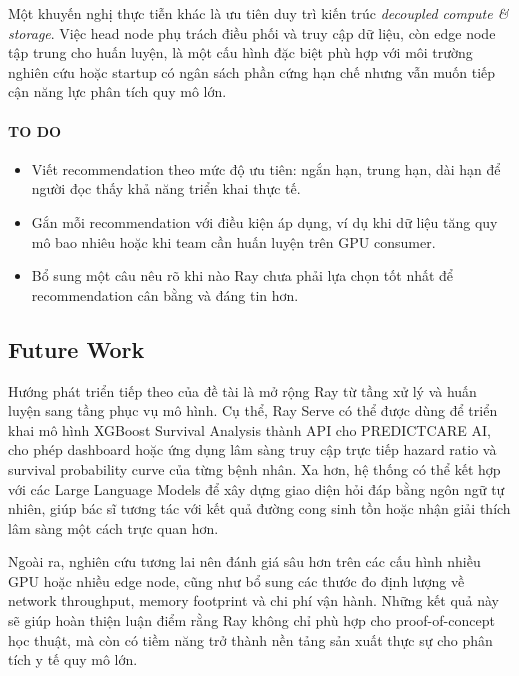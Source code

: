 Một khuyến nghị thực tiễn khác là ưu tiên duy trì kiến trúc \textit{decoupled compute \& storage}. Việc head node phụ trách điều phối và truy cập dữ liệu, còn edge node tập trung cho huấn luyện, là một cấu hình đặc biệt phù hợp với môi trường nghiên cứu hoặc startup có ngân sách phần cứng hạn chế nhưng vẫn muốn tiếp cận năng lực phân tích quy mô lớn.

\paragraph{TO DO}
\begin{itemize}
    \item Viết recommendation theo mức độ ưu tiên: ngắn hạn, trung hạn, dài hạn để người đọc thấy khả năng triển khai thực tế.
    \item Gắn mỗi recommendation với điều kiện áp dụng, ví dụ khi dữ liệu tăng quy mô bao nhiêu hoặc khi team cần huấn luyện trên GPU consumer.
    \item Bổ sung một câu nêu rõ khi nào Ray chưa phải lựa chọn tốt nhất để recommendation cân bằng và đáng tin hơn.
\end{itemize}

\subsection{Future Work}
Hướng phát triển tiếp theo của đề tài là mở rộng Ray từ tầng xử lý và huấn luyện sang tầng phục vụ mô hình. Cụ thể, Ray Serve có thể được dùng để triển khai mô hình XGBoost Survival Analysis thành API cho PREDICTCARE AI, cho phép dashboard hoặc ứng dụng lâm sàng truy cập trực tiếp hazard ratio và survival probability curve của từng bệnh nhân. Xa hơn, hệ thống có thể kết hợp với các Large Language Models để xây dựng giao diện hỏi đáp bằng ngôn ngữ tự nhiên, giúp bác sĩ tương tác với kết quả đường cong sinh tồn hoặc nhận giải thích lâm sàng một cách trực quan hơn.

Ngoài ra, nghiên cứu tương lai nên đánh giá sâu hơn trên các cấu hình nhiều GPU hoặc nhiều edge node, cũng như bổ sung các thước đo định lượng về network throughput, memory footprint và chi phí vận hành. Những kết quả này sẽ giúp hoàn thiện luận điểm rằng Ray không chỉ phù hợp cho proof-of-concept học thuật, mà còn có tiềm năng trở thành nền tảng sản xuất thực sự cho phân tích y tế quy mô lớn.

